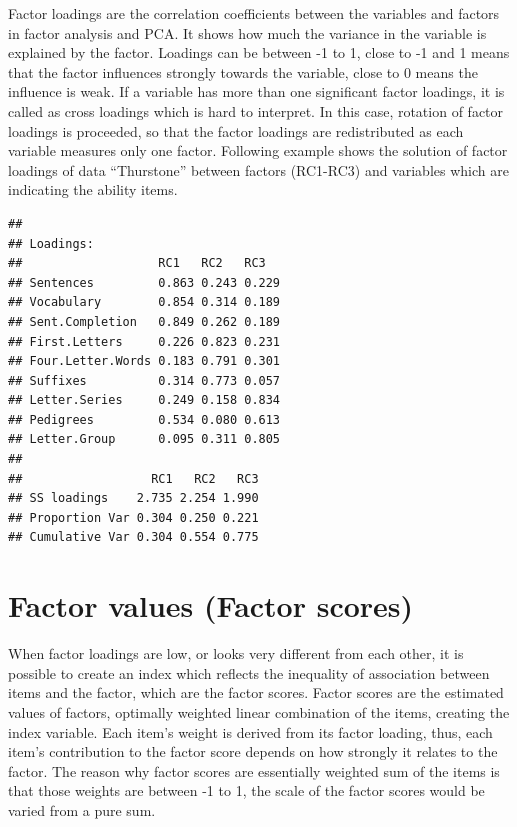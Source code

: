 \documentclass[]{book}
\newenvironment{Shaded}{\begin{snugshade}}{\end{snugshade}}
\newcommand{\DataTypeTok}[1]{\textcolor[rgb]{0.13,0.29,0.53}{#1}}
\newcommand{\DecValTok}[1]{\textcolor[rgb]{0.00,0.00,0.81}{#1}}
\newcommand{\KeywordTok}[1]{\textcolor[rgb]{0.13,0.29,0.53}{\textbf{#1}}}
\newcommand{\NormalTok}[1]{#1}
\newcommand{\OperatorTok}[1]{\textcolor[rgb]{0.81,0.36,0.00}{\textbf{#1}}}
\newcommand{\StringTok}[1]{\textcolor[rgb]{0.31,0.60,0.02}{#1}}
\begin{document}
Factor loadings are the correlation coefficients between the variables and factors in factor analysis and PCA. It shows how much the variance in the variable is explained by the factor. Loadings can be between -1 to 1, close to -1 and 1 means that the factor influences strongly towards the variable, close to 0 means the influence is weak.
If a variable has more than one significant factor loadings, it is called as cross loadings which is hard to interpret. In this case, rotation of factor loadings is proceeded, so that the factor loadings are redistributed as each variable measures only one factor.
Following example shows the solution of factor loadings of data ``Thurstone'' between factors (RC1-RC3) and variables which are indicating the ability items.

\begin{Shaded}
\end{Shaded}

\begin{verbatim}
## 
## Loadings:
##                   RC1   RC2   RC3  
## Sentences         0.863 0.243 0.229
## Vocabulary        0.854 0.314 0.189
## Sent.Completion   0.849 0.262 0.189
## First.Letters     0.226 0.823 0.231
## Four.Letter.Words 0.183 0.791 0.301
## Suffixes          0.314 0.773 0.057
## Letter.Series     0.249 0.158 0.834
## Pedigrees         0.534 0.080 0.613
## Letter.Group      0.095 0.311 0.805
## 
##                  RC1   RC2   RC3
## SS loadings    2.735 2.254 1.990
## Proportion Var 0.304 0.250 0.221
## Cumulative Var 0.304 0.554 0.775
\end{verbatim}

\hypertarget{factor-values-factor-scores}{%
\section{Factor values (Factor scores)}\label{factor-values-factor-scores}}

When factor loadings are low, or looks very different from each other, it is possible to create an index which reflects the inequality of association between items and the factor, which are the factor scores. Factor scores are the estimated values of factors, optimally weighted linear combination of the items, creating the index variable. Each item's weight is derived from its factor loading, thus, each item's contribution to the factor score depends on how strongly it relates to the factor. The reason why factor scores are essentially weighted sum of the items is that those weights are between -1 to 1, the scale of the factor scores would be varied from a pure sum.
\end{document}
